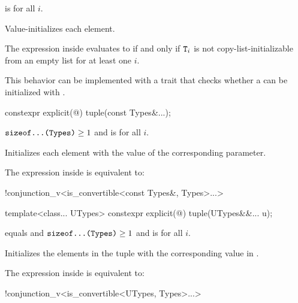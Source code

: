 \begin{itemdescr}
\pnum
\constraints
{} is  for all $i$.

\pnum
\effects
Value-initializes each element.

\pnum
\remarks
The expression inside  evaluates to 
if and only if $\texttt{T}_i$ is not
copy-list-initializable from an empty list
for at least one $i$.
\begin{note}
This behavior can be implemented with a trait that checks whether
a  can be initialized with \tcode{\{\}}.
\end{note}
\end{itemdescr}

%
\begin{itemdecl}
constexpr explicit(@\seebelow@) tuple(const Types&...);
\end{itemdecl}

\begin{itemdescr}
\pnum
\constraints
$\texttt{sizeof...(Types)} \geq 1$ and
 is  for all $i$.

\pnum
\effects
Initializes each element with the value of the
corresponding parameter.

\pnum
\remarks
The expression inside  is equivalent to:
\begin{codeblock}
!conjunction_v<is_convertible<const Types&, Types>...>
\end{codeblock}
\end{itemdescr}

%
\begin{itemdecl}
template<class... UTypes> constexpr explicit(@\seebelow@) tuple(UTypes&&... u);
\end{itemdecl}

\begin{itemdescr}
\pnum
\constraints
{} equals  and
$\texttt{sizeof...(Types)} \geq 1$ and
 is  for all $i$.

\pnum
\effects
Initializes the elements in the tuple with the
corresponding value in .

\pnum
\remarks
The expression inside  is equivalent to:
\begin{codeblock}
!conjunction_v<is_convertible<UTypes, Types>...>
\end{codeblock}
\end{itemdescr}

